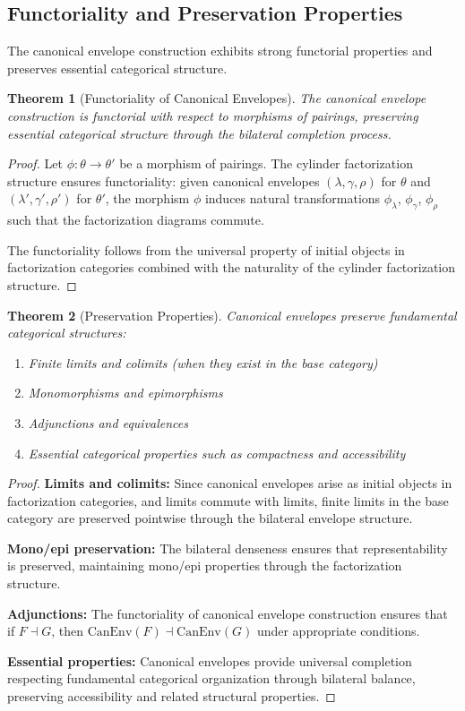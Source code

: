 \documentclass[11pt]{article}
\theoremstyle{plain}
\newtheorem{theorem}{Theorem}[section]
\theoremstyle{definition}
\theoremstyle{remark}
\begin{document}
\subsection{Functoriality and Preservation Properties}

The canonical envelope construction exhibits strong functorial properties and preserves essential categorical structure.

\begin{theorem}[Functoriality of Canonical Envelopes]
The canonical envelope construction is functorial with respect to morphisms of pairings, preserving essential categorical structure through the bilateral completion process.
\end{theorem}

\begin{proof}
Let $\phi : \theta \to \theta'$ be a morphism of pairings. The cylinder factorization structure ensures functoriality: given canonical envelopes $(\lambda, \gamma, \rho)$ for $\theta$ and $(\lambda', \gamma', \rho')$ for $\theta'$, the morphism $\phi$ induces natural transformations $\phi_\lambda$, $\phi_\gamma$, $\phi_\rho$ such that the factorization diagrams commute.

The functoriality follows from the universal property of initial objects in factorization categories combined with the naturality of the cylinder factorization structure.
\end{proof}

\begin{theorem}[Preservation Properties]
Canonical envelopes preserve fundamental categorical structures:
\begin{enumerate}
\item Finite limits and colimits (when they exist in the base category)
\item Monomorphisms and epimorphisms  
\item Adjunctions and equivalences
\item Essential categorical properties such as compactness and accessibility
\end{enumerate}
\end{theorem}

\begin{proof}
\textbf{Limits and colimits:} Since canonical envelopes arise as initial objects in factorization categories, and limits commute with limits, finite limits in the base category are preserved pointwise through the bilateral envelope structure.

\textbf{Mono/epi preservation:} The bilateral denseness ensures that representability is preserved, maintaining mono/epi properties through the factorization structure.

\textbf{Adjunctions:} The functoriality of canonical envelope construction ensures that if $F \dashv G$, then $\mathrm{CanEnv}(F) \dashv \mathrm{CanEnv}(G)$ under appropriate conditions.

\textbf{Essential properties:} Canonical envelopes provide universal completion respecting fundamental categorical organization through bilateral balance, preserving accessibility and related structural properties.
\end{proof}
\end{document}
